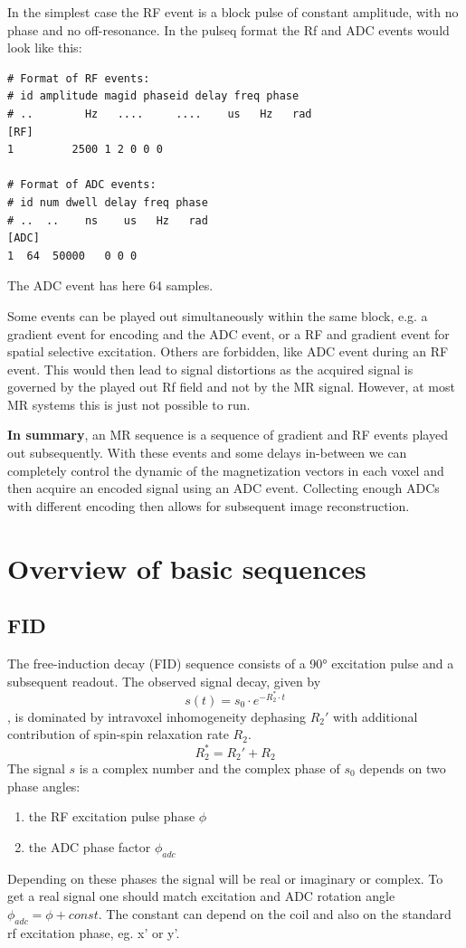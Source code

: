 \documentclass[a4paper,12pt]{extarticle}
\begin{document}
In the simplest case the RF event is a block pulse of constant amplitude, with no phase and no off-resonance. In the pulseq format the Rf and ADC events would look like this:
\begin{lstlisting}
# Format of RF events:
# id amplitude magid phaseid delay freq phase
# ..        Hz   ....     ....    us   Hz   rad
[RF]
1         2500 1 2 0 0 0

# Format of ADC events:
# id num dwell delay freq phase
# ..  ..    ns    us   Hz   rad
[ADC]
1  64  50000   0 0 0
\end{lstlisting}
The ADC event has here 64 samples. 

Some events can be played out simultaneously within the same block, e.g. a gradient event for encoding and the ADC event, or a RF and gradient event for spatial selective excitation. Others are forbidden, like ADC event during an RF event. This would then lead to signal distortions as the acquired signal is governed by the played out Rf field and not by the MR signal. However, at most MR systems this is just not possible to run.


\textbf{In summary}, an MR sequence is a sequence of gradient and RF events played out subsequently. With these events and some delays in-between we can completely control the dynamic of the magnetization vectors in each voxel and then acquire an encoded signal using an ADC event. Collecting enough ADCs with different encoding then allows for subsequent image reconstruction.

\newpage
\section{Overview of basic sequences}
\vspace{7.5cm}

\subsection{FID}
The free-induction decay (FID) sequence consists of a 90° excitation pulse and a subsequent readout. The observed signal decay, given by
\begin{equation}
\label{eq:FID}
s(t)=s_0\cdot e^{-R_2^*\cdot t}
\end{equation}
, is dominated by intravoxel inhomogeneity dephasing $R_2'$ with additional contribution of spin-spin relaxation rate $R_2$.
\begin{equation}
R_2^*=R_2'+R_2
\end{equation}The signal $s$ is a complex number and the complex phase of $s_0$ depends on two phase angles:
\begin{enumerate}
\item the RF excitation pulse phase $\phi$
\item the ADC phase factor $\phi_{adc}$
\end{enumerate}
Depending on these phases the signal will be real or imaginary or complex. To get a real signal one should match excitation and ADC rotation angle $\phi_{adc}=\phi+const.$ The constant can depend on the coil and also on the standard rf excitation phase, eg. x' or y'.
\end{document}
